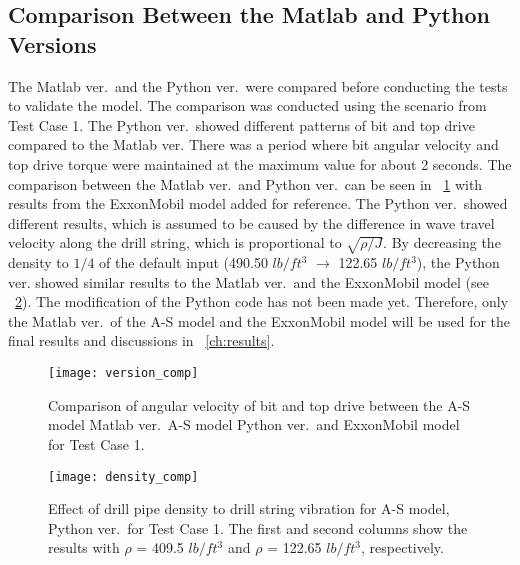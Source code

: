 \subsection{Comparison Between the Matlab and Python Versions}
The Matlab ver.\ and the Python ver.\ were compared before conducting the tests to validate the model. The comparison was conducted using the scenario from Test Case 1. The Python ver.\ showed different patterns of bit and top drive compared to the Matlab ver. There was a period where bit angular velocity and top drive torque were maintained at the maximum value for about 2 seconds. The comparison between the Matlab ver.\ and Python ver.\ can be seen in \figurename~\ref{figure_Test1_comp_chASmodel} with results from the ExxonMobil model added for reference. The Python ver.\ showed different results, which is assumed to be caused by the difference in wave travel velocity along the drill string, which is proportional to $\sqrt{\rho/J}$. By decreasing the density to $1/4$ of the default input (490.50 $lb/ft^3$ $\rightarrow$ 122.65 $lb/ft^3$), the Python ver. showed similar results to the Matlab ver.\ and the ExxonMobil model (see \figurename~\ref{figure_Python_reducedDensity}). The modification of the Python code has not been made yet. Therefore, only the Matlab ver.\ of the A-S model and the ExxonMobil model will be used for the final results and discussions in \chaptername~\ref{ch:results}.

\begin{figure}
  \centering
  \texttt{[image: version\_comp]}
  \caption[Comparison between different models for Test Case 1]{Comparison of angular velocity of bit and top drive between the A-S model Matlab ver.\, A-S model Python ver.\ and ExxonMobil model for Test Case 1.}\label{figure_Test1_comp_chASmodel}
\end{figure}

\begin{figure}
  \centering
  \texttt{[image: density\_comp]}
  \caption[Effect of drill pipe density in Python ver.\ for Test Case 1]{Effect of drill pipe density to drill string vibration for A-S model, Python ver.\ for Test Case 1.  The first and second columns show the results with $\rho$ = 409.5 $lb/ft^3$ and  $\rho$ = 122.65 $lb/ft^3$, respectively.}\label{figure_Python_reducedDensity}
\end{figure}


